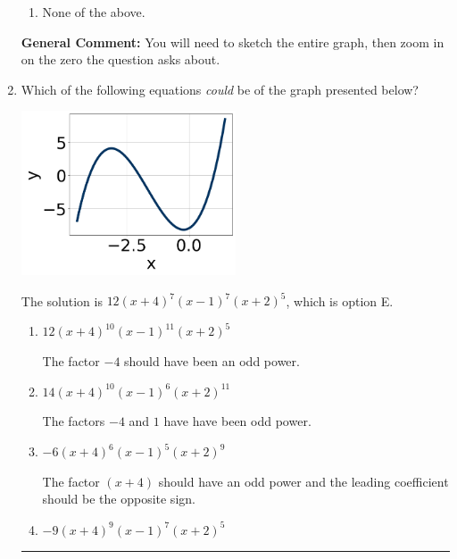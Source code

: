 \documentclass{extbook}[14pt]
\newcommand{\litem}[1]{\item #1

\rule{\textwidth}{0.4pt}}
\begin{document}
\begin{enumerate}
{\begin{enumerate}[label=\Alph*.]
\item None of the above.\end{enumerate}
\textbf{General Comment:} You will need to sketch the entire graph, then zoom in on the zero the question asks about.
}
\litem{
Which of the following equations \textit{could} be of the graph presented below?

\begin{center}
    \includegraphics[width=0.5\textwidth]{../Figures/polyGraphToFunctionCopyA.png}
\end{center}




The solution is \( 12(x + 4)^{7} (x - 1)^{7} (x + 2)^{5} \), which is option E.\begin{enumerate}[label=\Alph*.]
\item \( 12(x + 4)^{10} (x - 1)^{11} (x + 2)^{5} \)

The factor $-4$ should have been an odd power.
\item \( 14(x + 4)^{10} (x - 1)^{6} (x + 2)^{11} \)

The factors $-4$ and $1$ have have been odd power.
\item \( -6(x + 4)^{6} (x - 1)^{5} (x + 2)^{9} \)

The factor $(x + 4)$ should have an odd power and the leading coefficient should be the opposite sign.
\item \( -9(x + 4)^{9} (x - 1)^{7} (x + 2)^{5} \)


\end{enumerate}}
\end{enumerate}
\end{document}
